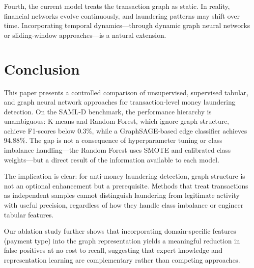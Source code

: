\documentclass[conference]{IEEEtran}
\begin{document}
Fourth, the current model treats the transaction graph as static. In reality, financial networks evolve continuously, and laundering patterns may shift over time. Incorporating temporal dynamics---through dynamic graph neural networks or sliding-window approaches---is a natural extension.


\section{Conclusion}\label{sec:conclusion}

This paper presents a controlled comparison of unsupervised, supervised tabular, and graph neural network approaches for transaction-level money laundering detection. On the SAML-D benchmark, the performance hierarchy is unambiguous: K-means and Random Forest, which ignore graph structure, achieve F1-scores below 0.3\%, while a GraphSAGE-based edge classifier achieves 94.88\%. The gap is not a consequence of hyperparameter tuning or class imbalance handling---the Random Forest uses SMOTE and calibrated class weights---but a direct result of the information available to each model.

The implication is clear: for anti-money laundering detection, graph structure is not an optional enhancement but a prerequisite. Methods that treat transactions as independent samples cannot distinguish laundering from legitimate activity with useful precision, regardless of how they handle class imbalance or engineer tabular features.

Our ablation study further shows that incorporating domain-specific features (payment type) into the graph representation yields a meaningful reduction in false positives at no cost to recall, suggesting that expert knowledge and representation learning are complementary rather than competing approaches.
\end{document}

